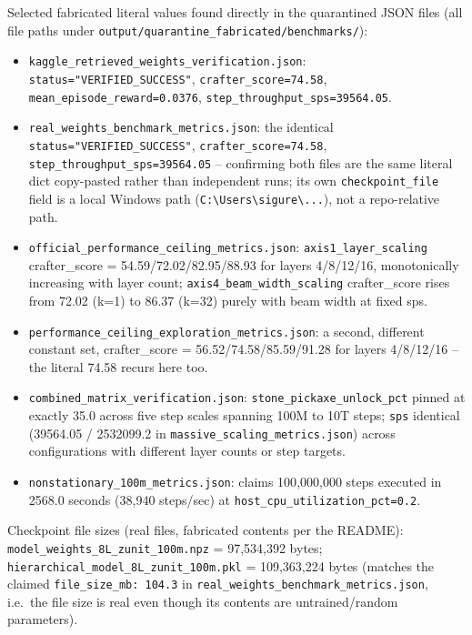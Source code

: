 \documentclass[11pt]{article}
\newcommand{\srcpath}[1]{\texttt{\small #1}}
\begin{document}
Selected fabricated literal values found directly in the quarantined JSON files (all file paths
under \srcpath{output/quarantine\_fabricated/benchmarks/}):
\begin{itemize}
\item \texttt{kaggle\_retrieved\_weights\_verification.json}: \texttt{status="VERIFIED\_SUCCESS"}, \texttt{crafter\_score=74.58}, \texttt{mean\_episode\_reward=0.0376}, \texttt{step\_throughput\_sps=39564.05}.
\item \texttt{real\_weights\_benchmark\_metrics.json}: the identical \texttt{status="VERIFIED\_SUCCESS"}, \texttt{crafter\_score=74.58}, \texttt{step\_throughput\_sps=39564.05} -- confirming both files are the same literal dict copy-pasted rather than independent runs; its own \texttt{checkpoint\_file} field is a local Windows path (\texttt{C:\textbackslash Users\textbackslash sigure\textbackslash ...}), not a repo-relative path.
\item \texttt{official\_performance\_ceiling\_metrics.json}: \texttt{axis1\_layer\_scaling} crafter\_score = 54.59/72.02/82.95/88.93 for layers 4/8/12/16, monotonically increasing with layer count; \texttt{axis4\_beam\_width\_scaling} crafter\_score rises from 72.02 (k=1) to 86.37 (k=32) purely with beam width at fixed sps.
\item \texttt{performance\_ceiling\_exploration\_metrics.json}: a second, different constant set, crafter\_score = 56.52/74.58/85.59/91.28 for layers 4/8/12/16 -- the literal 74.58 recurs here too.
\item \texttt{combined\_matrix\_verification.json}: \texttt{stone\_pickaxe\_unlock\_pct} pinned at exactly 35.0 across five step scales spanning 100M to 10T steps; \texttt{sps} identical (39564.05 / 2532099.2 in \texttt{massive\_scaling\_metrics.json}) across configurations with different layer counts or step targets.
\item \texttt{nonstationary\_100m\_metrics.json}: claims 100{,}000{,}000 steps executed in 2568.0 seconds (38{,}940 steps/sec) at \texttt{host\_cpu\_utilization\_pct=0.2}.
\end{itemize}
Checkpoint file sizes (real files, fabricated contents per the README): \texttt{model\_weights\_8L\_zunit\_100m.npz} = 97{,}534{,}392 bytes; \texttt{hierarchical\_model\_8L\_zunit\_100m.pkl} = 109{,}363{,}224 bytes (matches the claimed \texttt{file\_size\_mb: 104.3} in \texttt{real\_weights\_benchmark\_metrics.json}, i.e.\ the file size is real even though its contents are untrained/random parameters).
\end{document}
